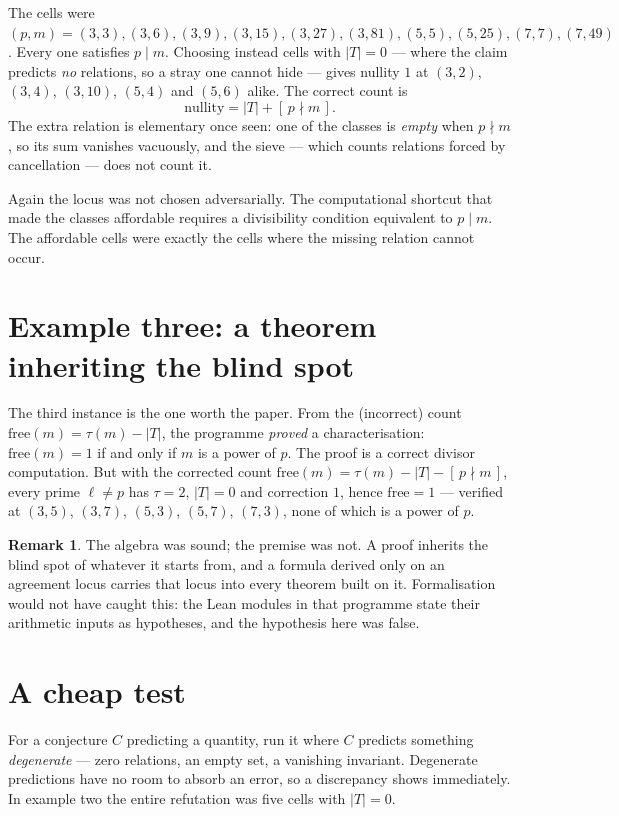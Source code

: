 \documentclass[11pt]{article}
\theoremstyle{plain}
\theoremstyle{definition}
\newtheorem{remark}[theorem]{Remark}
\begin{document}
The cells were $(p,m)=(3,3),(3,6),(3,9),(3,15),(3,27),(3,81),(5,5),(5,25),
(7,7),(7,49)$. Every one satisfies $p\mid m$. Choosing instead cells with
$|T|=0$ --- where the claim predicts \emph{no} relations, so a stray one cannot
hide --- gives nullity $1$ at $(3,2)$, $(3,4)$, $(3,10)$, $(5,4)$ and $(5,6)$
alike. The correct count is
\[
\text{nullity}=|T|+[\,p\nmid m\,].
\]
The extra relation is elementary once seen: one of the classes is \emph{empty}
when $p\nmid m$, so its sum vanishes vacuously, and the sieve --- which counts
relations forced by cancellation --- does not count it.

Again the locus was not chosen adversarially. The computational shortcut that
made the classes affordable requires a divisibility condition equivalent to
$p\mid m$. The affordable cells were exactly the cells where the missing
relation cannot occur.

\section{Example three: a theorem inheriting the blind spot}

The third instance is the one worth the paper. From the (incorrect) count
$\mathrm{free}(m)=\tau(m)-|T|$, the programme \emph{proved} a characterisation:
$\mathrm{free}(m)=1$ if and only if $m$ is a power of $p$. The proof is a
correct divisor computation. But with the corrected count
$\mathrm{free}(m)=\tau(m)-|T|-[\,p\nmid m\,]$, every prime $\ell\neq p$ has
$\tau=2$, $|T|=0$ and correction $1$, hence $\mathrm{free}=1$ --- verified at
$(3,5)$, $(3,7)$, $(5,3)$, $(5,7)$, $(7,3)$, none of which is a power of $p$.

\begin{remark}
The algebra was sound; the premise was not. A proof inherits the blind spot of
whatever it starts from, and a formula derived only on an agreement locus
carries that locus into every theorem built on it. Formalisation would not have
caught this: the Lean modules in that programme state their arithmetic inputs
as hypotheses, and the hypothesis here was false.
\end{remark}

\section{A cheap test}

For a conjecture $C$ predicting a quantity, run it where $C$ predicts something
\emph{degenerate} --- zero relations, an empty set, a vanishing invariant.
Degenerate predictions have no room to absorb an error, so a discrepancy shows
immediately. In example two the entire refutation was five cells with $|T|=0$.
\end{document}
